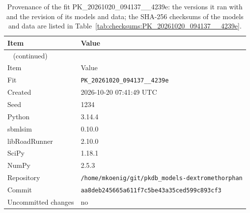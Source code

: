 \begin{longtable}{ll}
\caption{Provenance of the fit PK\_20261020\_094137\_\_4239e: the versions it ran with and the revision of its models and data; the SHA-256 checksums of the models and data are listed in Table~\ref{tab:checksums:PK_20261020_094137__4239e}.}\label{tab:provenance:PK_20261020_094137__4239e} \\
\toprule
Item & Value \\
\midrule
\endfirsthead
\multicolumn{2}{l}{\small\tablename~\thetable{} (continued)} \\
\toprule
Item & Value \\
\midrule
\endhead
\bottomrule
\endlastfoot
Fit & \texttt{PK\_20261020\_094137\_\_4239e} \\
Created & 2026-10-20 07:41:49 UTC \\
Seed & 1234 \\
Python & 3.14.4 \\
sbmlsim & 0.10.0 \\
libRoadRunner & 2.10.0 \\
SciPy & 1.18.1 \\
NumPy & 2.5.3 \\
Repository & \texttt{/home/mkoenig/git/pkdb\_models-dextromethorphan} \\
Commit & \texttt{aa8deb245665a611f7c5be43a35ced599c893cf3} \\
Uncommitted changes & no \\
\end{longtable}



